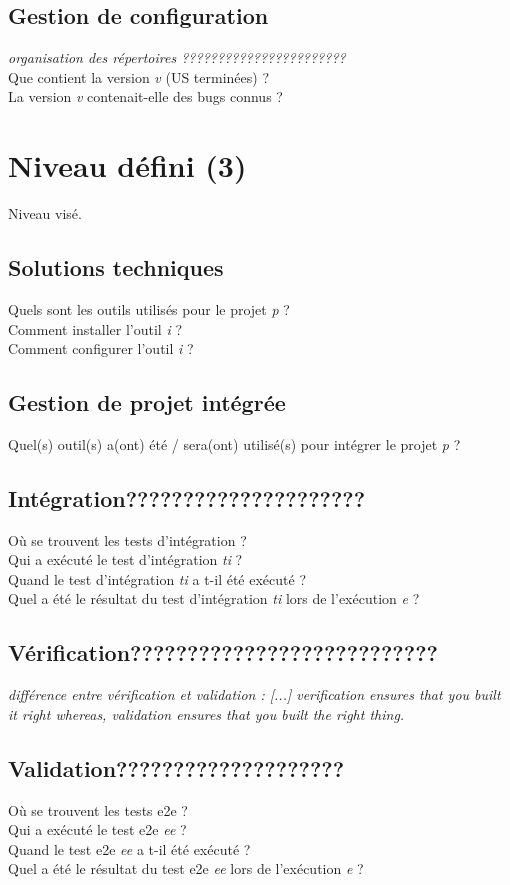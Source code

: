 \subsection{Gestion de configuration}
\noindent \textit{organisation des r\'epertoires ???????????????????????}\\
Que contient la version \textit{v} (US termin\'ees) ?\\
La version \textit{v} contenait-elle des bugs connus ?

\section{Niveau d\'efini (3)}
Niveau vis\'e.
\subsection{Solutions techniques}
\noindent Quels sont les outils utilis\'es pour le projet \textit{p} ?\\
Comment installer l'outil \textit{i} ?\\
Comment configurer l'outil \textit{i} ?
\subsection{Gestion de projet int\'egr\'ee}
\noindent Quel(s) outil(s) a(ont) \'et\'e / sera(ont) utilis\'e(s) pour int\'egrer le projet \textit{p} ?
\subsection{Int\'egration?????????????????????}
\noindent O\`u se trouvent les tests d'int\'egration ?\\
Qui a ex\'ecut\'e le test d'int\'egration \textit{ti} ?\\
Quand le test d'int\'egration \textit{ti} a t-il \'et\'e ex\'ecut\'e ?\\
Quel a \'et\'e le r\'esultat du test d'int\'egration \textit{ti} lors de l'ex\'ecution \textit{e} ?
\subsection{V\'erification???????????????????????????}
\noindent \textit{diff\'erence entre v\'erification et validation : [...] verification ensures that \og{}you built it right\fg{} whereas, validation ensures that \og{}you built the right thing\fg{}.}
\subsection{Validation????????????????????}
\noindent O\`u se trouvent les tests e2e ?\\
Qui a ex\'ecut\'e le test e2e \textit{ee} ?\\
Quand le test e2e \textit{ee} a t-il \'et\'e ex\'ecut\'e ?\\
Quel a \'et\'e le r\'esultat du test e2e \textit{ee} lors de l'ex\'ecution \textit{e} ?